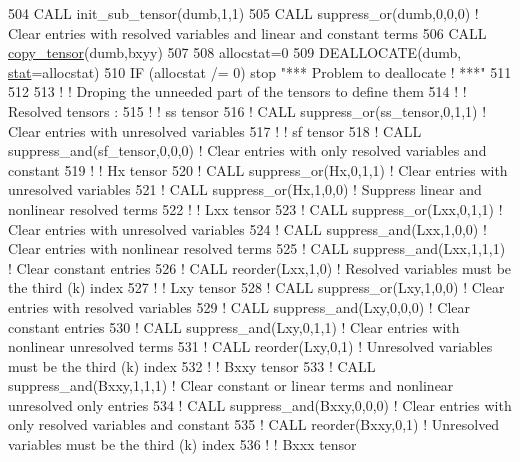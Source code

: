 \begin{DoxyCode}
504     \textcolor{keyword}{CALL }init\_sub\_tensor(dumb,1,1)
505     \textcolor{keyword}{CALL }suppress\_or(dumb,0,0,0) \textcolor{comment}{! Clear entries with resolved variables and linear and constant terms}
506     \textcolor{keyword}{CALL }\hyperlink{namespacetensor_a4a88ee8077278486c5128ad97617969e}{copy\_tensor}(dumb,bxyy)
507 
508     allocstat=0
509     \textcolor{keyword}{DEALLOCATE}(dumb, \hyperlink{namespacestat}{stat}=allocstat)
510     \textcolor{keywordflow}{IF} (allocstat /= 0)  stop \textcolor{stringliteral}{"*** Problem to deallocate ! ***"}
511 
512 
513     \textcolor{comment}{! ! Droping the unneeded part of the tensors to define them}
514     \textcolor{comment}{! ! Resolved tensors :}
515     \textcolor{comment}{! ! ss tensor}
516     \textcolor{comment}{! CALL suppress\_or(ss\_tensor,0,1,1) ! Clear entries with unresolved variables}
517     \textcolor{comment}{! ! sf tensor}
518     \textcolor{comment}{! CALL suppress\_and(sf\_tensor,0,0,0) ! Clear entries with only resolved variables and constant}
519     \textcolor{comment}{! ! Hx tensor}
520     \textcolor{comment}{! CALL suppress\_or(Hx,0,1,1) ! Clear entries with unresolved variables}
521     \textcolor{comment}{! CALL suppress\_or(Hx,1,0,0) ! Suppress linear and nonlinear resolved terms}
522     \textcolor{comment}{! ! Lxx tensor}
523     \textcolor{comment}{! CALL suppress\_or(Lxx,0,1,1) ! Clear entries with unresolved variables}
524     \textcolor{comment}{! CALL suppress\_and(Lxx,1,0,0) ! Clear entries with nonlinear resolved terms}
525     \textcolor{comment}{! CALL suppress\_and(Lxx,1,1,1) ! Clear constant entries}
526     \textcolor{comment}{! CALL reorder(Lxx,1,0) ! Resolved variables must be the third (k) index}
527     \textcolor{comment}{! ! Lxy tensor}
528     \textcolor{comment}{! CALL suppress\_or(Lxy,1,0,0) ! Clear entries with resolved variables}
529     \textcolor{comment}{! CALL suppress\_and(Lxy,0,0,0) ! Clear constant entries}
530     \textcolor{comment}{! CALL suppress\_and(Lxy,0,1,1) ! Clear entries with nonlinear unresolved terms}
531     \textcolor{comment}{! CALL reorder(Lxy,0,1) ! Unresolved variables must be the third (k) index}
532     \textcolor{comment}{! ! Bxxy tensor}
533     \textcolor{comment}{! CALL suppress\_and(Bxxy,1,1,1) ! Clear constant or linear terms and nonlinear unresolved only entries}
534     \textcolor{comment}{! CALL suppress\_and(Bxxy,0,0,0) ! Clear entries with only resolved variables and constant}
535     \textcolor{comment}{! CALL reorder(Bxxy,0,1) ! Unresolved variables must be the third (k) index}
536     \textcolor{comment}{! ! Bxxx tensor}

\end{DoxyCode}
